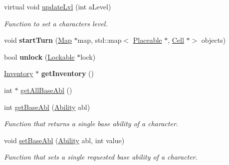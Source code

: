 \begin{DoxyCompactItemize}
virtual void \hyperlink{class_game_character_a0e6839e7c79e97ba7daea9ed0fc2569e}{update\+Lvl} (int a\+Level)
\begin{DoxyCompactList}\small\item\em Function to set a characters level. \end{DoxyCompactList}\item 
\hypertarget{class_game_character_a6f288196c757a627102c21edf49a6390}{}\label{class_game_character_a6f288196c757a627102c21edf49a6390} 
void {\bfseries start\+Turn} (\hyperlink{class_map}{Map} $\ast$map, std\+::map$<$ \hyperlink{class_placeable}{Placeable} $\ast$, \hyperlink{class_cell}{Cell} $\ast$$>$ objects)
\item 
\hypertarget{class_game_character_ac775c4c164ae60211f324fed6eed2e3f}{}\label{class_game_character_ac775c4c164ae60211f324fed6eed2e3f} 
bool {\bfseries unlock} (\hyperlink{class_lockable}{Lockable} $\ast$lock)
\item 
\hypertarget{class_game_character_add3f9ad86d6c9913b1be92a8b8b4d012}{}\label{class_game_character_add3f9ad86d6c9913b1be92a8b8b4d012} 
\hyperlink{class_inventory}{Inventory} $\ast$ {\bfseries get\+Inventory} ()
\item 
int $\ast$ \hyperlink{class_game_character_a9b1de762235904d9f11147780ffb45f1}{get\+All\+Base\+Abl} ()
\item 
\hypertarget{class_game_character_ac7dd71d84cef1fa1cc31787c2a2f02aa}{}\label{class_game_character_ac7dd71d84cef1fa1cc31787c2a2f02aa} 
int \hyperlink{class_game_character_ac7dd71d84cef1fa1cc31787c2a2f02aa}{get\+Base\+Abl} (\hyperlink{class_ability}{Ability} abl)
\begin{DoxyCompactList}\small\item\em Function that returns a single base ability of a character. \end{DoxyCompactList}\item 
\hypertarget{class_game_character_af604f6f1df72988de0b3f34625844545}{}\label{class_game_character_af604f6f1df72988de0b3f34625844545} 
void \hyperlink{class_game_character_af604f6f1df72988de0b3f34625844545}{set\+Base\+Abl} (\hyperlink{class_ability}{Ability} abl, int value)
\begin{DoxyCompactList}\small\item\em Function that sets a single requested base ability of a character. \end{DoxyCompactList}\item 
\hypertarget{class_game_character_a32f566a57e294fb9d22f2f0365c00fe8}{}\label{class_game_character_a32f566a57e294fb9d22f2f0365c00fe8} 
$$
\end{DoxyCompactItemize}
